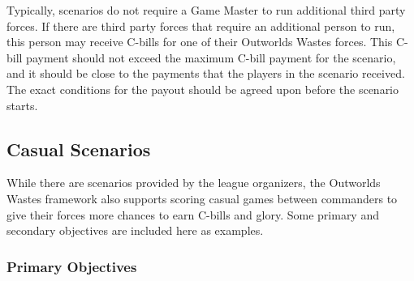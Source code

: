\documentclass{article}
\begin{document}
Typically, scenarios do not require a Game Master to run additional third party forces.
If there are third party forces that require an additional person to run, this person may receive C-bills for one of their Outworlds Wastes forces.
This C-bill payment should not exceed the maximum C-bill payment for the scenario, and it should be close to the payments that the players in the scenario received.
The exact conditions for the payout should be agreed upon before the scenario starts.

\pagebreak

\subsection{Casual Scenarios}

While there are scenarios provided by the league organizers, the Outworlds Wastes framework also supports scoring casual games between commanders to give their forces more chances to earn C-bills and glory.
Some primary and secondary objectives are included here as examples.

\subsubsection{Primary Objectives}
\end{document}
